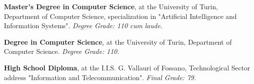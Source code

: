 
\begin{scholarship}
	{\textbf{Master's Degree in Computer Science}, at the University of Turin, Department of Computer Science, specialization in "Artificial Intelligence and Information Systems". \textit{Degree Grade: 110 cum laude.}}
					
	{\textbf{Degree in Computer Science}, at the University of Turin, Department of Computer Science. \textit{Degree Grade: 110.}}
						
	{\textbf{High School Diploma}, at the I.I.S. G. Vallauri of Fossano, Technological Sector address "Information and Telecommunication". \textit{Final Grade: 79.}}
		
\end{scholarship}